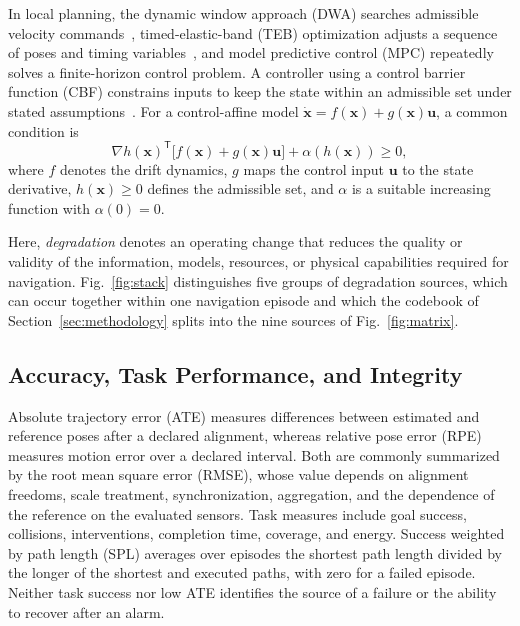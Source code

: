 In local planning, the dynamic window approach (DWA) searches admissible velocity commands~\cite{B_DWA1997}, timed-elastic-band (TEB) optimization adjusts a sequence of poses and timing variables~\cite{B_TEB2013}, and model predictive control (MPC) repeatedly solves a finite-horizon control problem. A controller using a control barrier function (CBF) constrains inputs to keep the state within an admissible set under stated assumptions~\cite{B_CBF2017,P_E24,P_E26}. For a control-affine model $\dot{\mathbf{x}}=f(\mathbf{x})+g(\mathbf{x})\mathbf{u}$, a common condition is
\begin{equation}
\nabla h(\mathbf{x})^{\mathsf T}\bigl[f(\mathbf{x})+g(\mathbf{x})\mathbf{u}\bigr]
+\alpha(h(\mathbf{x}))\geq 0,
\label{eq:cbf}
\end{equation}
where $f$ denotes the drift dynamics, $g$ maps the control input $\mathbf{u}$ to the state derivative, $h(\mathbf{x})\geq0$ defines the admissible set, and $\alpha$ is a suitable increasing function with $\alpha(0)=0$.

Here, \emph{degradation} denotes an operating change that reduces the quality or validity of the information, models, resources, or physical capabilities required for navigation. Fig.~\ref{fig:stack} distinguishes five groups of degradation sources, which can occur together within one navigation episode and which the codebook of Section~\ref{sec:methodology} splits into the nine sources of Fig.~\ref{fig:matrix}.

\subsection{Accuracy, Task Performance, and Integrity}
Absolute trajectory error (ATE) measures differences between estimated and reference poses after a declared alignment, whereas relative pose error (RPE) measures motion error over a declared interval. Both are commonly summarized by the root mean square error (RMSE), whose value depends on alignment freedoms, scale treatment, synchronization, aggregation, and the dependence of the reference on the evaluated sensors. Task measures include goal success, collisions, interventions, completion time, coverage, and energy. Success weighted by path length (SPL) averages over episodes the shortest path length divided by the longer of the shortest and executed paths, with zero for a failed episode. Neither task success nor low ATE identifies the source of a failure or the ability to recover after an alarm.

